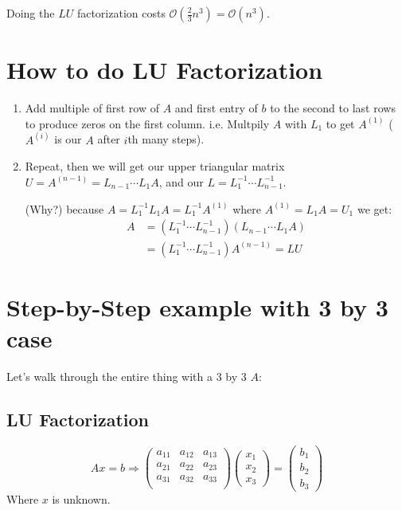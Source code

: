 \noi
Doing the $LU$ factorization costs $\mathcal{O}(\frac{2}{3}n^3) =
\mathcal{O}(n^3)$.
\section{How to do LU Factorization}
\label{sec:hwo}
\begin{enumerate}
\item Add multiple of first row of $A$ and first entry of $b$ to the
  second to last rows to produce zeros on the first
  column. i.e. Multpily $A$ with $L_1$ to get $A^{(1)}$ ($A^{(i)}$ is
  our $A$ after $i$th many steps).
\item Repeat, then we will get our upper triangular matrix 
  $U=A^{(n-1)}=L_{n-1}\cdots L_1A$, and our $L=L_{1}^{-1}\cdots
  L_{n-1}^{-1}$.

(Why?) because $A=L_1^{-1}L_1A=L_1^{-1}A^{(1)}$ where
$A^{(1)}=L_1A=U_1$ we get: 
  \begin{align*}
A&= (L_{1}^{-1}\cdots L_{n-1}^{-1})(L_{n-1}\cdots L_1A) \\
&=(L_{1}^{-1}\cdots L_{n-1}^{-1})A^{(n-1)}= LU    
  \end{align*}
\end{enumerate}

\section{Step-by-Step example with 3 by 3 case}
\label{sec:example}

Let's walk through the entire thing with a 3 by 3 $A$:

\subsection{LU Factorization}

$$Ax=b \Rightarrow
\begin{pmatrix}
  a_{11}&  a_{12}&  a_{13}\\
  a_{21}&  a_{22}&  a_{23}\\ 
 a_{31}&  a_{32}&  a_{33}\\
\end{pmatrix}
\begin{pmatrix}
  x_1\\ x_2 \\ x_3
\end{pmatrix}
=
\begin{pmatrix}
  b_1\\ b_2 \\ b_3
\end{pmatrix}
$$
Where $x$ is unknown. %

